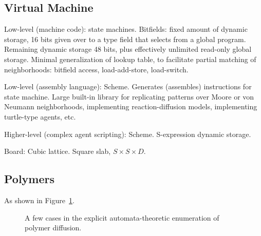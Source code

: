 \documentclass{acm_proc_article-sp}
\begin{document}
\subsection{Virtual Machine}

Low-level (machine code):
state machines.
Bitfields: fixed amount of dynamic storage, 16 bits given over to a type field that selects from a global program.
Remaining dynamic storage 48 bits, plus effectively unlimited read-only global storage.
Minimal generalization of lookup table, to facilitate partial matching of neighborhoods:
bitfield access, load-add-store, load-switch.

Low-level (assembly language):
Scheme. Generates (assembles) instructions for state machine.
Large built-in library for replicating patterns over Moore or von Neumann neighborhoods,
implementing reaction-diffusion models, implementing turtle-type agents, etc.

Higher-level (complex agent scripting):
Scheme. S-expression dynamic storage.

Board:
Cubic lattice.
Square slab, $S \times S \times D$.


\subsection{Polymers}

\cite{DoiEdwards}

As shown in Figure~\ref{fig:polymer}.

\begin{figure}
\caption{
\label{fig:polymer}
A few cases in the explicit automata-theoretic enumeration of polymer diffusion.
}
\end{figure}
\end{document}
